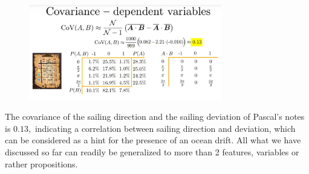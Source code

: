 \documentclass[12pt, a4paper]{scrartcl}
\begin{document}
\begin{figure}[H]
	\centering
	\includegraphics[width=0.75\textwidth]{3_12.png}
\end{figure}
The covariance of the sailing direction and the sailing deviation  of Pascal’s notes is $0.13,$ indicating a correlation between sailing direction and deviation, which can be considered as a hint for the presence of an ocean drift.
All what we have discussed so far can readily be generalized to more than 2 features, variables or rather propositions.\\%
\end{document}

